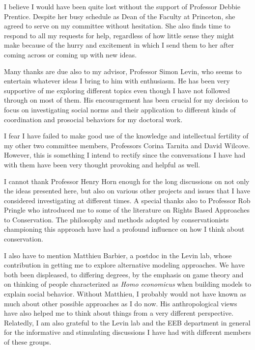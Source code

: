 \documentclass{report}
\begin{document}
I believe I would have been quite lost without the support of Professor Debbie Prentice. Despite her busy schedule as Dean of the Faculty at Princeton, she agreed to serve on my committee without hesitation. She also finds time to respond to all my requests for help, regardless of how little sense they might make because of the hurry and excitement in which I send them to her after coming across or coming up with new ideas.

Many thanks are due also to my advisor, Professor Simon Levin, who seems to entertain whatever ideas I bring to him with enthusiasm. He  has been very supportive of me exploring different topics even though I have not followed through on most of them. His encouragement has been crucial for my decision to focus on investigating social norms and their application to different kinds of coordination and prosocial behaviors for my doctoral work.

I fear I have failed to make good use of the knowledge and intellectual fertility of my other two committee members, Professors Corina Tarnita and David Wilcove. However, this is something I intend to rectify since the conversations I have had with them have been very thought provoking and helpful as well.

I cannot thank Professor Henry Horn enough for the long discussions on not only the ideas presented here, but also on various other projects and issues that I have considered investigating at different times. A special thanks also to Professor Rob Pringle who introduced me to some of the literature on Rights Based Approaches to Conservation. The philosophy and methods adopted by conservationists championing this approach have had a profound influence on how I think about conservation.

I also have to mention Matthieu Barbier, a postdoc in the Levin lab, whose contribution in getting me to explore alternative modeling approaches. We have both been displeased, to differing degrees, by the emphasis on game theory and on thinking of people characterized as \textit{Homo economicus} when building models to explain social behavior. Without Matthieu, I probably would not have known as much about other possible approaches as I do now. His anthropological views have also helped me to think about things from a very different perspective. Relatedly, I am also grateful to the Levin lab and the EEB department in general for the informative and stimulating discussions I have had with different members of these groups.
\end{document}
